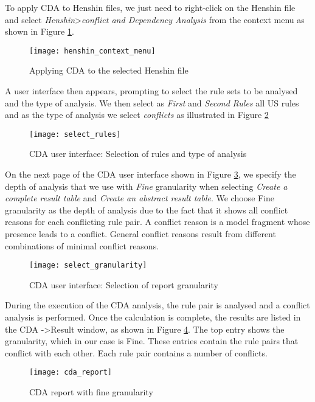 To apply CDA to Henshin files, we just need to right-click on the Henshin file and select \textit{Henshin}\textgreater\textit{conflict and Dependency Analysis} from the context menu as shown in Figure \ref{fig:henshin_context_menu}.
\begin{figure}[h]
	\center
	\texttt{[image: henshin\_context\_menu]}
	\caption{Applying CDA to the selected Henshin file}\label{fig:henshin_context_menu}
\end{figure}
A user interface then appears, prompting to select the rule sets to be analysed and the type of analysis. We then select as \textit{First} and \textit{Second} \textit{Rules} all US rules and as the type of analysis we select \textit{conflicts} as illustrated in Figure \ref{fig:select_rules}
\begin{figure}[h]
	\center
	\texttt{[image: select\_rules]}
	\caption{CDA user interface: Selection of rules and type of analysis}\label{fig:select_rules}
\end{figure}
 On the next page of the CDA user interface shown in Figure \ref{fig:select_granularity}, we specify the depth of analysis that we use with \textit{Fine} granularity when selecting \textit{Create a complete result table} and \textit{Create an abstract result table}. We choose Fine granularity as the depth of analysis due to the fact that it shows all conflict reasons for each conflicting rule pair. A conflict reason is a model fragment whose presence leads to a conflict. General conflict reasons result from different combinations of minimal conflict reasons\cite{cda_api}.
 \begin{figure}[h]
 	\center
 	\texttt{[image: select\_granularity]}
 	\caption{CDA user interface: Selection of report granularity}\label{fig:select_granularity}
 \end{figure}
 
 During the execution of the CDA analysis, the rule pair is analysed and a conflict analysis is performed. Once the calculation is complete, the results are listed in the CDA -\textgreater Result window, as shown in Figure \ref{fig:cda_report}. The top entry shows the granularity, which in our case is Fine. These entries contain the rule pairs that conflict with each other. Each rule pair contains a number of conflicts.
  \begin{figure}[h]
 	\center
 	\texttt{[image: cda\_report]}
 	\caption{CDA report with fine granularity}\label{fig:cda_report}
 \end{figure}
 
